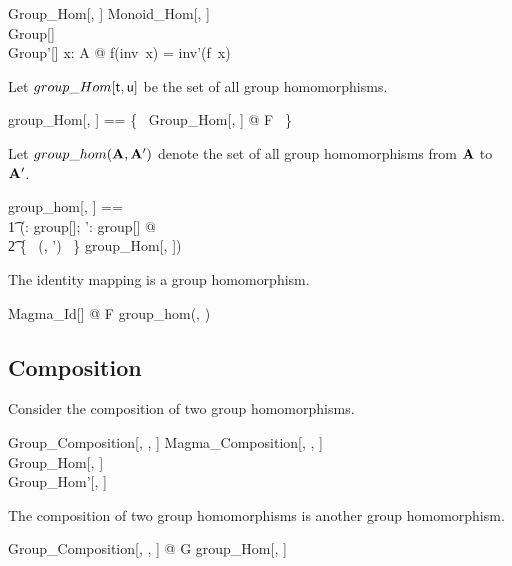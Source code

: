 \documentclass{amsart}
\begin{document}
\begin{schema}{Group\_Hom}[\genT, \genU]
	Monoid\_Hom[\genT, \genU] \\
	Group[\genT] \\
	Group'[\genU]
\where
	\forall x: A @ f(inv~x) = inv'(f~x)
\end{schema}

Let $group\_Hom[\mathsf{t}, \mathsf{u}]$ be the set of all group homomorphisms.

\begin{zed}
	group\_Hom[\genT, \genU] == \{~ Group\_Hom[\genT, \genU] @ F ~\}
\end{zed}

Let $group\_hom(\mathbf{A}, \mathbf{A}')$ denote the set of all group homomorphisms from $\mathbf{A}$ to $\mathbf{A}'$.

\begin{zed}
	group\_hom[\genT, \genU] == \\
	\t1	(\lambda \strucA: group[\genT]; \strucA': group[\genU] @ \\
	\t2		\{~ (\strucA, \strucA') ~\} \dres group\_Hom[\genT, \genU])
\end{zed}

\begin{example}[Identity]

The identity mapping is a group homomorphism.

\begin{zed}
	\forall Magma\_Id[\setT] @ F \in group\_hom(\strucA, \strucA)
\end{zed}

\end{example}

\subsection{Composition}

Consider the composition of two group homomorphisms.

\begin{schema}{Group\_Composition}[\genT, \genU, \genV]
	Magma\_Composition[\genT, \genU, \genV] \\
	Group\_Hom[\genT, \genU] \\
	Group\_Hom'[\genU, \genV]
\end{schema}

\begin{remark}
The composition of two group homomorphisms is another group homomorphism.

\begin{zed}
	\forall Group\_Composition[\setT, \setU, \setV] @ G \in group\_Hom[\setT, \setV]
\end{zed}

\end{remark}
\end{document}
